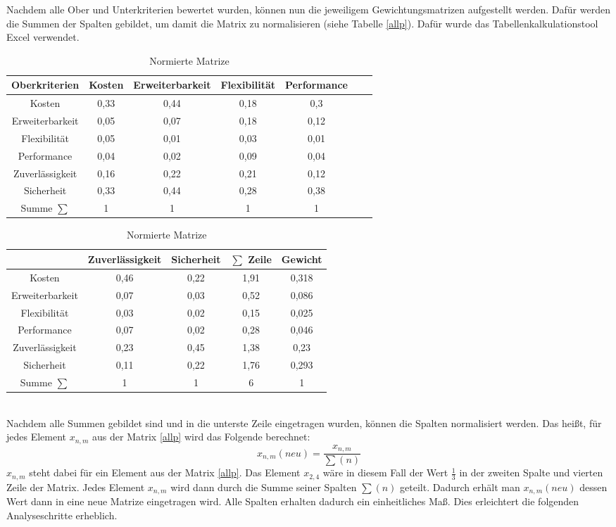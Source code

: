 Nachdem alle Ober und Unterkriterien bewertet wurden, können nun die jeweiligem Gewichtungsmatrizen aufgestellt werden. Dafür werden die Summen der Spalten gebildet, um damit die Matrix zu normalisieren (siehe Tabelle \ref{allp}). Dafür wurde das Tabellenkalkulationstool Excel verwendet.
\begin{table}[h!]
	\centering
	\begin{tabular}{c|cccccc}
		Oberkriterien   & Kosten			 & Erweiterbarkeit & Flexibilität & Performance   \\ 
		\hline
		Kosten          & 0,33    	  & 0,44    &       0,18  &      0,3      \\
		Erweiterbarkeit &   0,05     & 0,07    &       0,18  &      0,12      \\
		Flexibilität    &   0,05     &  0,01   & 0,03            &      0,01       \\
		Performance     &    0,04    &  0,02   &        0,09      & 0,04           \\
		Zuverlässigkeit &    0,16    & 0,22    &        0,21      &      0,12       \\
		Sicherheit      &    0,33    &  0,44   &        0,28      &       0,38       \\
		\hline
		Summe $\sum$    &  	1			&	1		&		1		&	1
	\end{tabular}
	\begin{tabular}{c|cc|c|c}
		&	Zuverlässigkeit & Sicherheit &$\sum$ Zeile& Gewicht \\ 
		\hline
		Kosten          &        0,46        &        0,22   &1,91 &0,318\\
		Erweiterbarkeit &        0,07        &       0,03   &  0,52& 0,086\\
		Flexibilität    &        0,03         &      0,02    & 0,15 & 0,025\\
		Performance     &        0,07         &      0,02    &  0,28& 0,046\\
		Zuverlässigkeit & 0,23               &      0,45     &  1,38&0,23\\
		Sicherheit      &        0,11       & 0,22    &  1,76& 0,293\\
		\hline
		Summe $\sum$    &  		1			&   1 &6 &1
	\end{tabular}
	\caption{Normierte Matrize}
	\label{allp2}
\end{table}\\
Nachdem alle Summen gebildet sind und in die unterste Zeile eingetragen wurden, können die Spalten normalisiert werden. Das heißt, für jedes Element $x_{n,m}$ aus der Matrix \ref{allp} wird das Folgende berechnet:
\[x_{n,m}(neu)=\frac{x_{n,m}}{\sum(n)}\]
$x_{n,m}$ steht dabei für ein Element aus der Matrix \ref{allp}. Das Element $x_{2,4}$ wäre in diesem Fall der Wert $\frac{1}{3}$ in der zweiten Spalte und vierten Zeile der Matrix. Jedes Element $x_{n,m}$ wird dann durch die Summe seiner Spalten $\sum(n)$ geteilt. Dadurch erhält man $x_{n,m}(neu)$ dessen Wert dann in eine neue Matrize eingetragen wird. Alle Spalten erhalten dadurch ein einheitliches Maß. Dies erleichtert die folgenden Analyseschritte erheblich.


